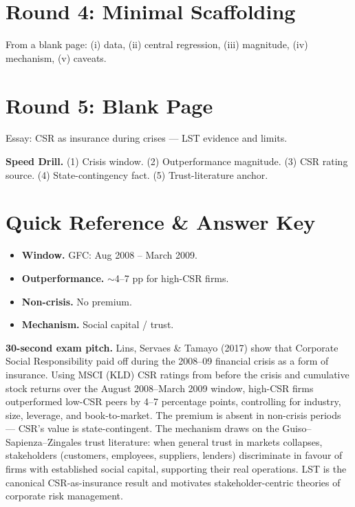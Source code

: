 \documentclass[11pt]{article}
\begin{document}
\section*{Round 4: Minimal Scaffolding}
From a blank page: (i) data, (ii) central regression, (iii) magnitude, (iv) mechanism, (v) caveats.

\section*{Round 5: Blank Page}
Essay: CSR as insurance during crises --- LST evidence and limits.

\vspace{6pt}
\begin{drillbox}
\textbf{Speed Drill.} (1) Crisis window. (2) Outperformance magnitude. (3) CSR rating source. (4) State-contingency fact. (5) Trust-literature anchor.
\end{drillbox}

\section*{Quick Reference \& Answer Key}
\begin{answerbox}
\begin{itemize}
\item \textbf{Window.} GFC: Aug 2008 -- March 2009.
\item \textbf{Outperformance.} $\sim$4--7 pp for high-CSR firms.
\item \textbf{Non-crisis.} No premium.
\item \textbf{Mechanism.} Social capital / trust.
\end{itemize}
\end{answerbox}

\begin{keybox}
\textbf{30-second exam pitch.} Lins, Servaes \& Tamayo (2017) show that Corporate Social Responsibility paid off during the 2008--09 financial crisis as a form of insurance. Using MSCI (KLD) CSR ratings from before the crisis and cumulative stock returns over the August 2008--March 2009 window, high-CSR firms outperformed low-CSR peers by 4--7 percentage points, controlling for industry, size, leverage, and book-to-market. The premium is absent in non-crisis periods --- CSR's value is state-contingent. The mechanism draws on the Guiso--Sapienza--Zingales trust literature: when general trust in markets collapses, stakeholders (customers, employees, suppliers, lenders) discriminate in favour of firms with established social capital, supporting their real operations. LST is the canonical CSR-as-insurance result and motivates stakeholder-centric theories of corporate risk management.
\end{keybox}
\end{document}
